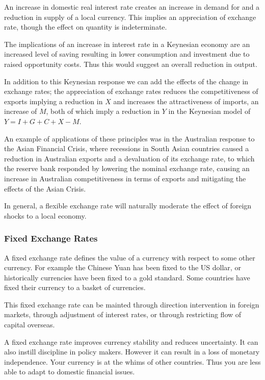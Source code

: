 \documentclass[12pt]{report}
\begin{document}
\begin{flushleft}
An increase in domestic real interest rate creates an increase in demand for 
and a reduction in supply of a local currency. This implies an appreciation
of exchange rate, though the effect on quantity is indeterminate. \par
The implications of an increase in interest rate in a Keynesian economy are
an increased level of saving resulting in lower consumption and investment due
to raised opportunity costs. Thus this would suggest an overall reduction in
output. \par
In addition to this Keynesian response we can add the effects of the change in
exchange rates; the appreciation of exchange rates reduces the competitiveness
of exports implying a reduction in \(X\) and increases the attractiveness of
imports, an increase of \(M\), both of which imply a reduction in \(Y\) in the
Keynesian model of \(Y = I + G  + C + X - M\). \par
An example of applications of these principles was in the Australian response
to the Asian Financial Crisis, where recessions in South Asian countries caused
a reduction in Australian exports and a devaluation of its exchange rate, to
which the reserve bank responded by lowering the nominal exchange rate, causing
an increase in Australian competitiveness in terms of exports and mitigating
the effects of the Asian Crisis. \par
In general, a flexible exchange rate will naturally moderate the effect of
foreign shocks to a local economy.

\subsubsection*{Fixed Exchange Rates}

A fixed exchange rate defines the value of a currency with respect to some
other currency. For example the Chinese Yuan has been fixed to the US dollar,
or historically currencies have been fixed to a gold standard. Some countries
have fixed their currency to a basket of currencies. \par
This fixed exchange rate can be mainted through direction intervention in
foreign markets, through adjustment of interest rates, or through restricting
flow of capital overseas. \par
A fixed exchange rate improves currency stability and reduces uncertainty. It
can also instill discipline in policy makers. However it can result in a loss
of monetary independence. Your currency is at the whims of other countries.
Thus you are less able to adapt to domestic financial issues.


\end{flushleft}
\end{document}
